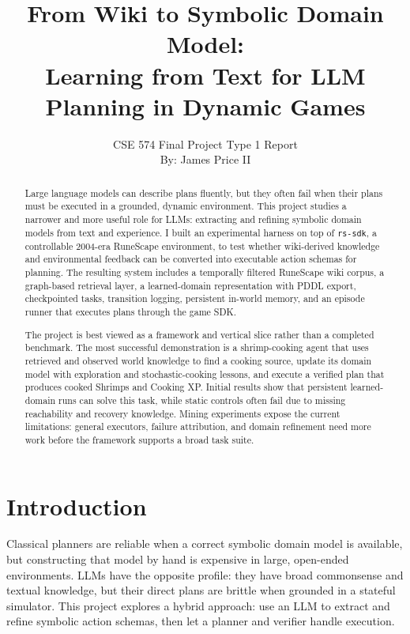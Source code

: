 \documentclass[10pt,twocolumn,letterpaper]{article}
\begin{document}
\title{From Wiki to Symbolic Domain Model:\\ Learning from Text for LLM Planning in Dynamic Games}

\author{CSE 574 Final Project Type 1 Report\\
By: James Price II}

\maketitle

\begin{abstract}
Large language models can describe plans fluently, but they often fail when their plans must be executed in a grounded, dynamic environment. This project studies a narrower and more useful role for LLMs: extracting and refining symbolic domain models from text and experience. I built an experimental harness on top of \texttt{rs-sdk}, a controllable 2004-era RuneScape environment, to test whether wiki-derived knowledge and environmental feedback can be converted into executable action schemas for planning. The resulting system includes a temporally filtered RuneScape wiki corpus, a graph-based retrieval layer, a learned-domain representation with PDDL export, checkpointed tasks, transition logging, persistent in-world memory, and an episode runner that executes plans through the game SDK.

The project is best viewed as a framework and vertical slice rather than a completed benchmark. The most successful demonstration is a shrimp-cooking agent that uses retrieved and observed world knowledge to find a cooking source, update its domain model with exploration and stochastic-cooking lessons, and execute a verified plan that produces cooked Shrimps and Cooking XP. Initial results show that persistent learned-domain runs can solve this task, while static controls often fail due to missing reachability and recovery knowledge. Mining experiments expose the current limitations: general executors, failure attribution, and domain refinement need more work before the framework supports a broad task suite.
\end{abstract}

\section{Introduction}

Classical planners are reliable when a correct symbolic domain model is available, but constructing that model by hand is expensive in large, open-ended environments. LLMs have the opposite profile: they have broad commonsense and textual knowledge, but their direct plans are brittle when grounded in a stateful simulator. This project explores a hybrid approach: use an LLM to extract and refine symbolic action schemas, then let a planner and verifier handle execution.
\end{document}
